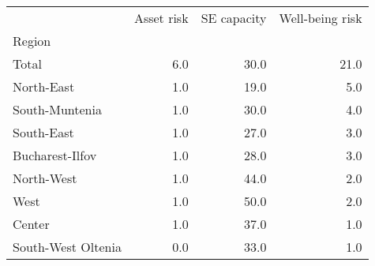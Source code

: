 \begin{tabular}{lrrr}
\toprule
{} &  Asset risk &  SE capacity &  Well-being risk \\
Region             &             &              &                  \\
\midrule
Total              &         6.0 &         30.0 &             21.0 \\
North-East         &         1.0 &         19.0 &              5.0 \\
South-Muntenia     &         1.0 &         30.0 &              4.0 \\
South-East         &         1.0 &         27.0 &              3.0 \\
Bucharest-Ilfov    &         1.0 &         28.0 &              3.0 \\
North-West         &         1.0 &         44.0 &              2.0 \\
West               &         1.0 &         50.0 &              2.0 \\
Center             &         1.0 &         37.0 &              1.0 \\
South-West Oltenia &         0.0 &         33.0 &              1.0 \\
\bottomrule
\end{tabular}
